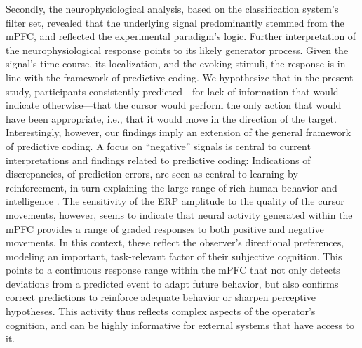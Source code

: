 Secondly, the neurophysiological analysis, based on the classification system's filter set, revealed that the underlying signal predominantly stemmed from the mPFC, and reflected the experimental paradigm's logic. Further interpretation of the neurophysiological response points to its likely generator process. Given the signal's time course, its localization, and the evoking stimuli, the response is in line with the framework of predictive coding. We hypothesize that in the present study, participants consistently predicted---for lack of information that would indicate otherwise---that the cursor would perform the only action that would have been appropriate, i.e., that it would move in the direction of the target. Interestingly, however, our findings imply an extension of the general framework of predictive coding. A focus on ``negative'' signals is central to current interpretations and findings related to predictive coding: Indications of discrepancies, of prediction errors, are seen as central to learning by reinforcement, in turn explaining the large range of rich human behavior and intelligence \cite{hawkins2004intelligence}. The sensitivity of the ERP amplitude to the quality of the cursor movements, however, seems to indicate that neural activity generated within the mPFC provides a range of graded responses to both positive and negative movements. In this context, these reflect the observer's directional preferences, modeling an important, task-relevant factor of their subjective cognition. This points to a continuous response range within the mPFC that not only detects deviations from a predicted event to adapt future behavior, but also confirms correct predictions to reinforce adequate behavior or sharpen perceptive hypotheses. This activity thus reflects complex aspects of the operator's cognition, and can be highly informative for external systems that have access to it.


